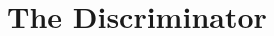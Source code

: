 \documentclass{article}
\begin{document}
\section{The Discriminator}
    \begin{multicols}{2}
    
    \end{multicols}
\end{document}
